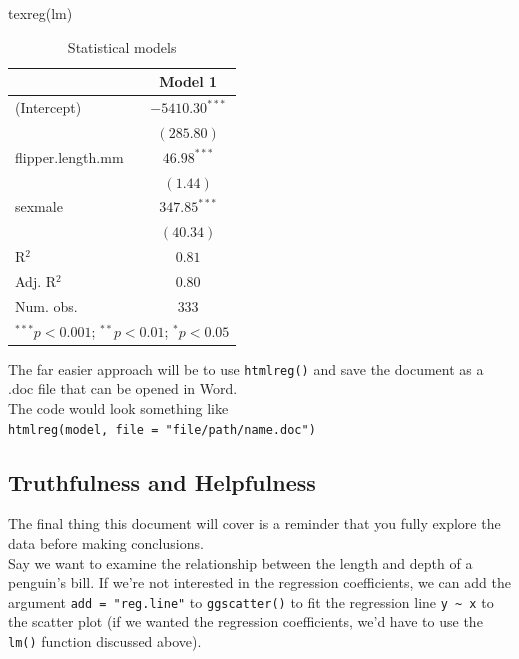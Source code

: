 \documentclass[
]{article}
\newenvironment{Shaded}{\begin{snugshade}}{\end{snugshade}}
\newcommand{\FunctionTok}[1]{\textcolor[rgb]{0.00,0.00,0.00}{#1}}
\newcommand{\NormalTok}[1]{#1}
\begin{document}
\begin{Shaded}
\begin{Highlighting}[]
\FunctionTok{texreg}\NormalTok{(lm)}
\end{Highlighting}
\end{Shaded}

\begin{table}
\begin{center}
\begin{tabular}{l c}
\hline
 & Model 1 \\
\hline
(Intercept)       & $-5410.30^{***}$ \\
                  & $(285.80)$       \\
flipper.length.mm & $46.98^{***}$    \\
                  & $(1.44)$         \\
sexmale           & $347.85^{***}$   \\
                  & $(40.34)$        \\
\hline
R$^2$             & $0.81$           \\
Adj. R$^2$        & $0.80$           \\
Num. obs.         & $333$            \\
\hline
\multicolumn{2}{l}{\scriptsize{$^{***}p<0.001$; $^{**}p<0.01$; $^{*}p<0.05$}}
\end{tabular}
\caption{Statistical models}
\label{table:coefficients}
\end{center}
\end{table}

The far easier approach will be to use \texttt{htmlreg()} and save the
document as a .doc file that can be opened in Word.\\
The code would look something like
\texttt{htmlreg(model,\ file\ =\ "file/path/name.doc")}

\hypertarget{truthfulness-and-helpfulness}{%
\subsection{Truthfulness and
Helpfulness}\label{truthfulness-and-helpfulness}}

The final thing this document will cover is a reminder that you fully
explore the data before making conclusions.\\
Say we want to examine the relationship between the length and depth of
a penguin's bill. If we're not interested in the regression
coefficients, we can add the argument \texttt{add\ =\ "reg.line"} to
\texttt{ggscatter()} to fit the regression line
\texttt{y\ \textasciitilde{}\ x} to the scatter plot (if we wanted the
regression coefficients, we'd have to use the \texttt{lm()} function
discussed above).
\end{document}
